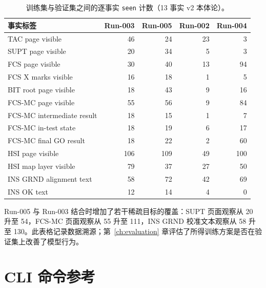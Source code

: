 \begin{table}[htbp]
\centering
\caption{训练集与验证集之间的逐事实 \texttt{seen} 计数（13 事实 v2 本体论）。}
\label{tab:fact-distributions}
\small
\begin{tabularx}{\textwidth}{@{}>{\raggedright\arraybackslash}Xrrrr@{}}
\toprule
\textbf{事实标签} & \textbf{Run-003} & \textbf{Run-005} & \textbf{Run-002} & \textbf{Run-004} \\
\midrule
TAC page visible            & 46  & 24  & 23 & 3  \\
SUPT page visible           & 20  & 34  & 5  & 3  \\
FCS page visible            & 30  & 40  & 13 & 94 \\
FCS X marks visible         & 16  & 18  & 1  & 5  \\
BIT root page visible       & 18  & 43  & 9  & 16 \\
FCS-MC page visible         & 55  & 56  & 9  & 84 \\
FCS-MC intermediate result  & 18  & 15  & 1  & 7  \\
FCS-MC in-test state        & 18  & 19  & 6  & 17 \\
FCS-MC final GO result      & 18  & 22  & 2  & 60 \\
HSI page visible            & 106 & 109 & 49 & 100 \\
HSI map layer visible       & 79  & 37  & 27 & 50 \\
INS GRND alignment text     & 58  & 72  & 42 & 69 \\
INS OK text                 & 12  & 14  & 4  & 0  \\
\bottomrule
\end{tabularx}
\end{table}


Run-005 与 Run-003 结合时增加了若干稀疏目标的覆盖：SUPT 页面观察从 20 升至 54，FCS-MC 页面观察从 55 升至 111，INS GRND 校准文本观察从 58 升至 130。此表格记录数据溯源；第~\ref{ch:evaluation} 章评估了所得训练方案是否在验证集上改善了模型行为。

\section{CLI 命令参考}\label{sec:appendix-cli}

